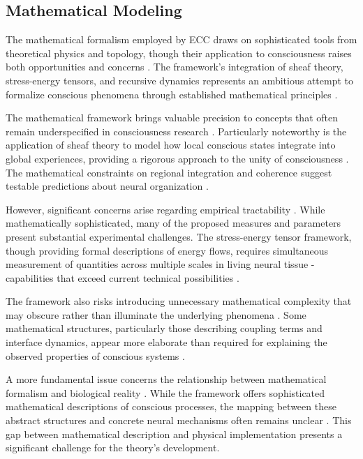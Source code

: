 \subsection{Mathematical Modeling}

The mathematical formalism employed by ECC draws on sophisticated tools from theoretical physics and topology, though their application to consciousness raises both opportunities and concerns \cite{rosen2012anticipatory, langer2009philosophy}. The framework's integration of sheaf theory, stress-energy tensors, and recursive dynamics represents an ambitious attempt to formalize conscious phenomena through established mathematical principles \cite{varela2016embodied}.

The mathematical framework brings valuable precision to concepts that often remain underspecified in consciousness research \cite{thompson2014waking}. Particularly noteworthy is the application of sheaf theory to model how local conscious states integrate into global experiences, providing a rigorous approach to the unity of consciousness \cite{zahavi2014self}. The mathematical constraints on regional integration and coherence suggest testable predictions about neural organization \cite{feinberg2016ancient}.

However, significant concerns arise regarding empirical tractability \cite{koch2019feeling}. While mathematically sophisticated, many of the proposed measures and parameters present substantial experimental challenges. The stress-energy tensor framework, though providing formal descriptions of energy flows, requires simultaneous measurement of quantities across multiple scales in living neural tissue - capabilities that exceed current technical possibilities \cite{deacon2011incomplete}.

The framework also risks introducing unnecessary mathematical complexity that may obscure rather than illuminate the underlying phenomena \cite{dennett2017bacteria}. Some mathematical structures, particularly those describing coupling terms and interface dynamics, appear more elaborate than required for explaining the observed properties of conscious systems \cite{merleau2012phenomenology}.

A more fundamental issue concerns the relationship between mathematical formalism and biological reality \cite{churchland2013touching}. While the framework offers sophisticated mathematical descriptions of conscious processes, the mapping between these abstract structures and concrete neural mechanisms often remains unclear \cite{noe2009out}. This gap between mathematical description and physical implementation presents a significant challenge for the theory's development.

